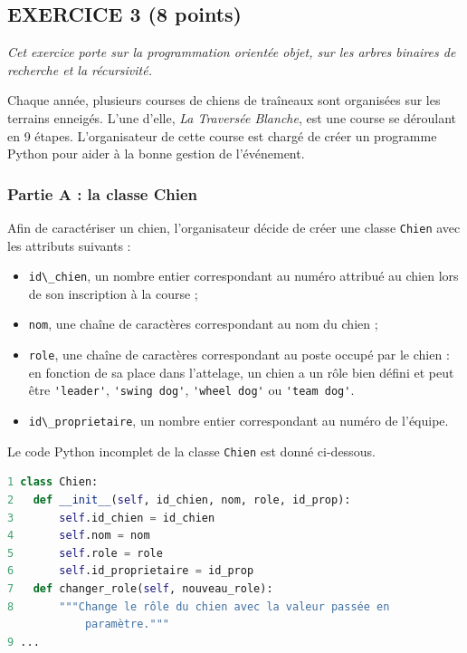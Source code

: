 

\subsection{EXERCICE 3 (8 points)}\label{exercice-3-8-points}

\emph{Cet exercice porte sur la programmation orientée objet, sur les
arbres binaires de recherche et la récursivité.}

Chaque année, plusieurs courses de chiens de traîneaux sont organisées
sur les terrains enneigés. L'une d'elle, \emph{La Traversée Blanche},
est une course se déroulant en 9 étapes. L'organisateur de cette course
est chargé de créer un programme Python pour aider à la bonne gestion de
l'événement.

\subsubsection{Partie A : la classe
Chien}\label{partie-a-la-classe-chien}

Afin de caractériser un chien, l'organisateur décide de créer une classe
\passthrough{\lstinline!Chien!} avec les attributs suivants :

\begin{itemize}
\item
  \passthrough{\lstinline!id\_chien!}, un nombre entier correspondant au
  numéro attribué au chien lors de son inscription à la course ;
\item
  \passthrough{\lstinline!nom!}, une chaîne de caractères correspondant
  au nom du chien ;
\item
  \passthrough{\lstinline!role!}, une chaîne de caractères correspondant
  au poste occupé par le chien : en fonction de sa place dans
  l'attelage, un chien a un rôle bien défini et peut être
  \passthrough{\lstinline!'leader'!},
  \passthrough{\lstinline!'swing dog'!},
  \passthrough{\lstinline!'wheel dog'!} ou
  \passthrough{\lstinline!'team dog'!}.
\item
  \passthrough{\lstinline!id\_proprietaire!}, un nombre entier
  correspondant au numéro de l'équipe.
\end{itemize}

Le code Python incomplet de la classe \passthrough{\lstinline!Chien!}
est donné ci-dessous.

\begin{lstlisting}[language=Python]
1 class Chien:
2   def __init__(self, id_chien, nom, role, id_prop):
3       self.id_chien = id_chien
4       self.nom = nom
5       self.role = role
6       self.id_proprietaire = id_prop
7   def changer_role(self, nouveau_role):
8       """Change le rôle du chien avec la valeur passée en
            paramètre."""
9 ...
\end{lstlisting}

